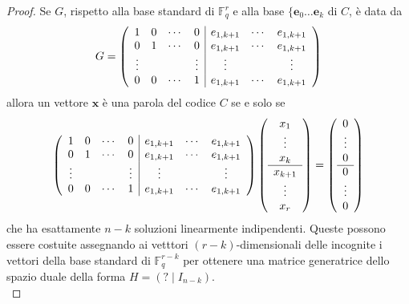 \begin{proof}
   Se $G$, rispetto alla base standard di $\mathbb{F}_{q}^{r}$ e alla base $\lbrace \mathbf{e}_{0} \dots \mathbf{e}_{k} $ di $C$, è data da
   \begin{align*}
      G=
      \left(
      \begin{array} {c c c c | c c c }
      1 & 0 & \cdots & 0 & e_{1,k+1} & \cdots &e_{1,k+1}   \\
      0 & 1 & \cdots & 0 & e_{1,k+1} & \cdots &e_{1,k+1}   \\
       \vdots & &  & \vdots & \vdots  &  &  \vdots   \\
      0 & 0 & \cdots & 1 & e_{1,k+1} & \cdots &e_{1,k+1}
      \end{array}
      \right)
   \end{align*}
   allora un vettore $\mathbf{x}$ è una parola del codice $C$ se e solo se
   \begin{align*}
      \left(
      \begin{array} {c c c c | c c c }
      1 & 0 & \cdots & 0 & e_{1,k+1} & \cdots &e_{1,k+1}   \\
      0 & 1 & \cdots & 0 & e_{1,k+1} & \cdots &e_{1,k+1}   \\
       \vdots & &  & \vdots & \vdots  &  &  \vdots   \\
      0 & 0 & \cdots & 1 & e_{1,k+1} & \cdots &e_{1,k+1}
      \end{array}
      \right)
      \left(
      \begin{array} {c  }
      x_1    \\
      \vdots    \\
      x_{k}   \\
      \hline
      x_{k + 1}   \\
       \vdots    \\
      x_{r}   \\
      \end{array}
      \right)
      =
      \left(
      \begin{array} {c  }
      0    \\
      \vdots    \\
      0   \\
      \hline
      0   \\
       \vdots    \\
      0   \\
      \end{array}
      \right)
   \end{align*}
   che ha esattamente $n-k$ soluzioni linearmente indipendenti. Queste possono essere costuite assegnando ai vetttori $(r-k)$-dimensionali delle incognite i vettori della base standard di $\mathbb{F}_{q}^{r-k}$ per ottenere una matrice generatrice dello spazio duale della forma $H = ( ? \mid I_{n-k})$. \\

\end{proof}
